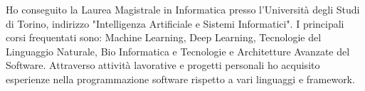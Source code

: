 \par{
	Ho conseguito la Laurea Magistrale in Informatica presso l'Università degli Studi di Torino, indirizzo "Intelligenza Artificiale e Sistemi Informatici". I principali corsi frequentati sono: Machine Learning, Deep Learning, Tecnologie del Linguaggio Naturale, Bio Informatica e Tecnologie e Architetture Avanzate del Software.
	Attraverso attività lavorative e progetti personali ho acquisito esperienze nella programmazione software rispetto a vari linguaggi e framework.
}
\smallskip